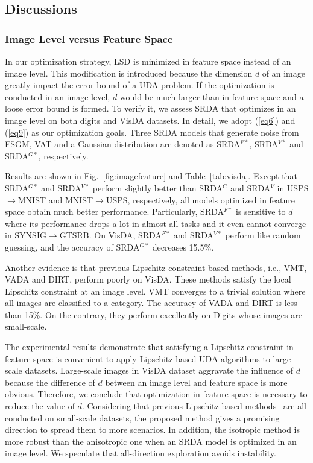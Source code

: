 \documentclass[journal,twocolumn]{IEEEtran}
\theoremstyle{definition}
\begin{document}
\subsection{Discussions}

\subsubsection{Image Level versus Feature Space}

In our optimization strategy, LSD is minimized in feature space instead of an image level. This modification is introduced  because the dimension $d$ of an image greatly impact the error bound of a UDA problem. If the optimization is conducted in an image level, $d$ would be much larger than in feature space and a loose error bound is formed. To verify it, we assess SRDA that optimizes in an image level on both digits and VisDA datasets. In detail, we adopt (\ref{eq6}) and (\ref{eq9}) as our optimization goals. Three SRDA models that generate noise from FSGM, VAT and a Gaussian distribution are denoted as SRDA$^{F*}$, SRDA$^{V*}$ and SRDA$^{G*}$, respectively. 

Results are shown in Fig.~\ref{fig:imagefeature} and Table~\ref{tab:visda}. Except that SRDA$^{G*}$ and SRDA$^{V*}$ perform slightly better than SRDA$^G$ and SRDA$^V$ in USPS$\rightarrow$MNIST and MNIST$\rightarrow$USPS, respectively, all models optimized in feature space obtain much better performance. Particularly, SRDA$^{F*}$ is sensitive to $d$ where its performance drops a lot in almost all tasks and it even cannot converge in SYNSIG$\rightarrow$GTSRB. On VisDA, SRDA$^{F*}$ and SRDA$^{V*}$ perform like random guessing, and the accuracy of SRDA$^{G*}$ decreases 15.5\%. 

Another evidence is that previous Lipschitz-constraint-based methods, i.e., VMT, VADA and DIRT, perform poorly on VisDA. These methods satisfy the local Lipschitz constraint at an image level. VMT converges to a trivial solution where all images are classified to a category. The accuracy of VADA and DIRT is less than 15\%. On the contrary, they perform excellently on Digits whose images are small-scale.

The experimental results demonstrate that satisfying a Lipschitz constraint in feature space is convenient to apply Lipschitz-based UDA algorithms to large-scale datasets. Large-scale images in VisDA dataset aggravate the influence of $d$ because the difference of $d$ between an image level and feature space is more obvious. Therefore, we conclude that optimization in feature space is necessary to reduce the value of $d$. Considering that previous Lipschitz-based methods~\cite{shu2018a,mao2019virtual} are all conducted on small-scale datasets, the proposed method gives a promising direction to spread them to more scenarios. In addition, the isotropic method is more robust than the anisotropic one when an SRDA model is optimized in an image level. We speculate that all-direction exploration avoids instability.
\end{document}
